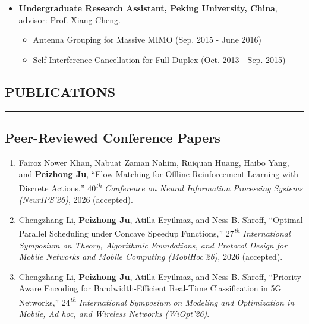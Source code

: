 \documentclass[10pt,letter]{article}
\begin{document}
\begin{small}
\begin{itemize}
\item {\bf Undergraduate Research Assistant, Peking University, China}, advisor: Prof. Xiang Cheng.
\begin{itemize}
    \item Antenna Grouping for Massive MIMO (Sep. 2015 - June 2016)
    \item Self-Interference Cancellation for Full-Duplex (Oct. 2013 - Sep. 2015)
\end{itemize}




\end{itemize}





\subsection*{PUBLICATIONS}
\hrule
\vspace{0.25cm}

\subsection*{Peer-Reviewed Conference Papers}

\begin{enumerate}

    \item Fairoz Nower Khan, Nabuat Zaman Nahim, Ruiquan Huang, Haibo Yang, and \textbf{Peizhong Ju}, ``Flow Matching for Offline Reinforcement Learning with Discrete Actions,'' \textit{$40$\textsuperscript{th} Conference on Neural Information Processing Systems (NeurIPS'26)}, 2026 (accepted).

    \item Chengzhang Li, \textbf{Peizhong Ju}, Atilla Eryilmaz, and Ness B. Shroff, ``Optimal Parallel Scheduling under Concave Speedup Functions,'' \textit{$27$\textsuperscript{th} International Symposium on Theory, Algorithmic Foundations, and Protocol Design for Mobile Networks and Mobile Computing (MobiHoc'26)}, 2026 (accepted).

    \item Chengzhang Li, \textbf{Peizhong Ju}, Atilla Eryilmaz, and Ness B. Shroff, ``Priority-Aware Encoding for Bandwidth-Efficient Real-Time Classification in 5G Networks,'' \textit{$24$\textsuperscript{th} International Symposium on Modeling and Optimization in Mobile, Ad hoc, and Wireless Networks (WiOpt'26)}.


\end{enumerate}
\end{small}
\end{document}
